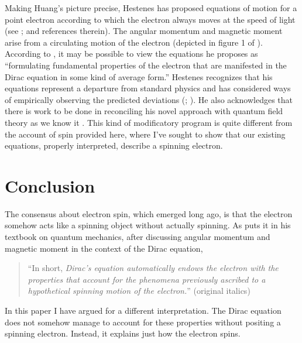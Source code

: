 \documentclass[onecolumn,secnumarabic,amsmath,amssymb,balancelastpage,nofootinbib]{article}
\begin{document}
Making Huang's picture precise, Hestenes has proposed equations of motion for a point electron according to which the electron always moves at the speed of light (see \citealp{gull1993}; \citealp{hestenes2008, hestenes2010} and references therein).  The angular momentum and magnetic moment arise from a circulating motion of the electron (depicted in figure 1 of \citealp{hestenes2008}).  According to \citet[pg.\ 2]{hestenes2010}, it may be possible to view the equations he proposes as ``formulating fundamental properties of the electron that are manifested in the Dirac equation in some kind of average form.''  Hestenes recognizes that his equations represent a departure from standard physics and has considered ways of empirically observing the predicted deviations (\citealp{hestenes2008}; \citealp[sections 9.1 and 11]{hestenes2010}).  He also acknowledges that there is work to be done in reconciling his novel approach with quantum field theory as we know it \citep[pg.\ 53]{hestenes2010}.  This kind of modificatory program is quite different from the account of spin provided here, where I've sought to show that our existing equations, properly interpreted, describe a spinning electron.






\section{Conclusion}

The consensus about electron spin, which emerged long ago, is that the electron somehow acts like a spinning object without actually spinning.  As \citet[pg.\ 514]{rojansky} puts it in his textbook on quantum mechanics, after discussing angular momentum and magnetic moment in the context of the Dirac equation,
\begin{quote}
``In short, \emph{Dirac's equation automatically endows the electron with the properties that account for the phenomena previously ascribed to a hypothetical spinning motion of the electron.}'' (original italics)
\end{quote}
In this paper I have argued for a different interpretation. The Dirac equation does not somehow manage to account for these properties without positing a spinning electron.  Instead, it explains just how the electron spins.
\end{document}
